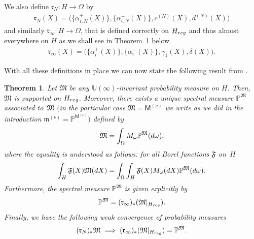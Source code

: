 \documentclass[11pt]{article}
\numberwithin{equation}{section}
\newtheorem{Theorem}{Theorem}[section]
\begin{document}
We also define $\mathfrak{r}_N\colon H \to \Omega$ by
\begin{gather*}
\mathfrak{r}_N(X)=\big(\big\{\alpha_{i,N}^{+}(X)\big\}, \big\{\alpha_{i,N}^{-}(X)\big\}, c^{(N)}(X), d^{(N)}(X)\big)
\end{gather*}
and similarly $\mathfrak{r}_{\infty}\colon H \to \Omega$, that is defined correctly on $H_{{\rm reg}}$ and thus almost everywhere on $H$ as we shall see in Theorem~\ref{ErgodicMethodTheorem} below
\begin{gather*}
\mathfrak{r}_\infty(X)=\big(\big\{\alpha_{i}^{+}(X)\big\}, \big\{\alpha_{i}^{-}(X)\big\}, \gamma_1(X), \delta(X)\big).
\end{gather*}

With all these definitions in place we can now state the following result from \cite[Section 5]{BorodinOlshanskiErgodic}.

\begin{Theorem}\label{ErgodicMethodTheorem}Let $\mathfrak{M}$ be any $\mathbb{U}(\infty)$-invariant probability measure on $H$. Then, $\mathfrak{M}$ is supported on $H_{{\rm reg}}$. Moreover, there exists a unique spectral measure $\mathbb{P}^{\mathfrak{M}}$ associated to~$\mathfrak{M}$ $($in the particular case $\mathfrak{M}=\mathsf{M}^{(\nu)}$ we write as we did in the introduction $\mathfrak{m}^{(\nu)}=\mathbb{P}^{\mathsf{M}^{(\nu)}})$ defined by
\begin{gather*}
\mathfrak{M}=\int_{\Omega}^{}M_{\omega} \mathbb{P}^{\mathfrak{M}}({\rm d}\omega),
\end{gather*}
where the equality is understood as follows: for all Borel functions $\mathfrak{F}$ on~$H$
\begin{gather*}
\int_{H}^{}\mathfrak{F}(X)\mathfrak{M}({\rm d}X)=\int_{\Omega}^{}\int_{H}^{}\mathfrak{F}(X)M_{\omega}({\rm d}X)\mathbb{P}^{\mathfrak{M}}({\rm d}\omega).
\end{gather*}
Furthermore, the spectral measure $\mathbb{P}^{\mathfrak{M}}$ is given explicitly by
\begin{gather*}
\mathbb{P}^{\mathfrak{M}}= (\mathfrak{r}_{\infty} )_* (\mathfrak{M}|_{H_{{\rm reg}}} ).
\end{gather*}
Finally, we have the following weak convergence of probability measures
\begin{gather*}
 (\mathfrak{r}_N )_* \mathfrak{M} \implies (\mathfrak{r}_{\infty} )_* (\mathfrak{M}|_{H_{{\rm reg}}} )=\mathbb{P}^{\mathfrak{M}}.
\end{gather*}
\end{Theorem}
\end{document}
